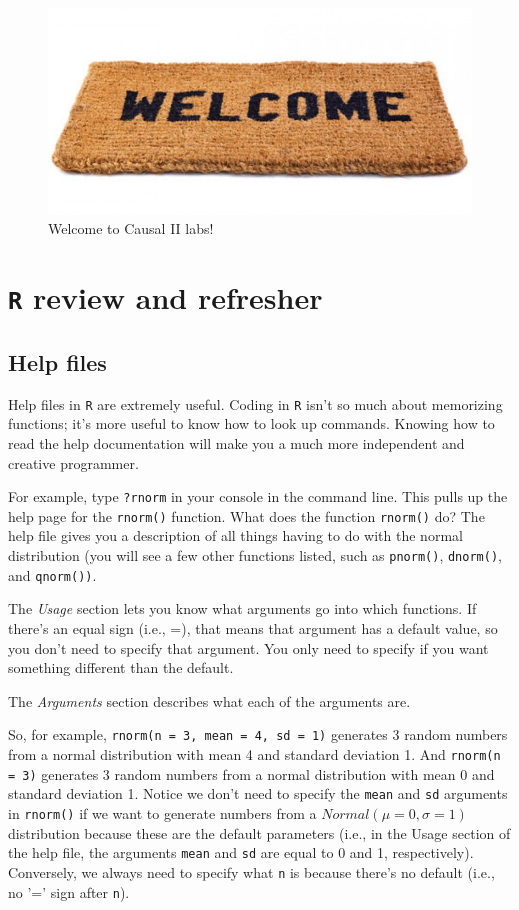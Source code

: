 \documentclass{exam}
\begin{document}
\begin{figure}
\begin{center}
\includegraphics[width=.4\textwidth]{welcome.jpg}
\caption{Welcome to Causal II labs!}
\end{center}
\end{figure}

\section{\texttt{R} review and refresher}
\subsection{Help files}

Help files in \texttt{R} are extremely useful. Coding in \texttt{R} isn't so much about memorizing functions; it's more useful to know how to look up commands. Knowing how to read the help documentation will make you a much more independent and creative programmer. 

\noindent For example, type \texttt{?rnorm} in your console in the command line. This pulls up the help page for the \texttt{rnorm()} function. What does the function \texttt{rnorm()} do? The help file gives you a description of all things having to do with the normal distribution (you will see a few other functions listed, such as \texttt{pnorm()}, \texttt{dnorm()}, and \texttt{qnorm())}.

\noindent The \textit{Usage} section lets you know what arguments go into which functions. If there's an equal sign (i.e., =), that means that argument has a default value, so you don't need to specify that argument. You only need to specify if you want something different than the default. 

\noindent The \textit{Arguments} section describes what each of the arguments are. 

\noindent So, for example, \texttt{rnorm(n = 3, mean = 4, sd = 1)} generates 3 random numbers from a normal distribution with mean 4 and standard deviation 1. And \texttt{rnorm(n = 3)} generates 3 random numbers from a normal distribution with mean 0 and standard deviation 1. Notice we don't need to specify the \texttt{mean} and \texttt{sd} arguments in \texttt{rnorm()} if we want to generate numbers from a $Normal(\mu = 0, \sigma = 1)$ distribution because these are the default parameters (i.e., in the Usage section of the help file, the arguments \texttt{mean} and \texttt{sd} are equal to 0 and 1, respectively). Conversely, we always need to specify what \texttt{n} is because there's no default (i.e., no '=' sign after \texttt{n}).
\end{document}
